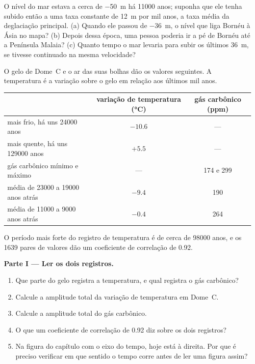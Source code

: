 \begin{exercise}[$\star\star\star$]\label{exo:g12:past-climates:15}
O nível do mar estava a cerca de \qty{-50}{m} há \num{11000} anos; suponha
que ele tenha subido então a uma taxa constante de \qty{12}{m} por mil anos,
a taxa média da deglaciação principal. (a) Quando ele passou de
\qty{-36}{m}, o nível que liga Bornéu à Ásia no mapa? (b) Depois dessa
época, uma pessoa poderia ir a pé de Bornéu até a Península Malaia? (c)
Quanto tempo o mar levaria para subir os últimos \qty{36}{m}, se tivesse
continuado na mesma velocidade?
\end{exercise}

\begin{problem}
\label{pb:g12:past-climates:1}
O gelo de Dome~C e o ar das suas bolhas dão os valores seguintes. A
temperatura é a variação sobre o gelo em relação aos últimos mil anos.

\begin{center}
\small
\begin{tabular}{|l|c|c|}
\hline
 & \textbf{variação de temperatura (\unit{\degreeCelsius})} & \textbf{gás carbônico (ppm)} \\
\hline
mais frio, há uns \num{24000} anos & $-10.6$ & --- \\
mais quente, há uns \num{129000} anos & $+5.5$ & --- \\
gás carbônico mínimo e máximo & --- & 174 e 299 \\
média de \num{23000} a \num{19000} anos atrás & $-9.4$ & 190 \\
média de \num{11000} a \num{9000} anos atrás & $-0.4$ & 264 \\
\hline
\end{tabular}
\end{center}

O período mais forte do registro de temperatura é de cerca de \num{98000}
anos, e os 1639 pares de valores dão um coeficiente de correlação de 0.92.

\medskip
\noindent\textbf{Parte I --- Ler os dois registros.}
\begin{enumerate}
  \item Que parte do gelo registra a temperatura, e qual registra o gás
        carbônico?
  \item Calcule a amplitude total da variação de temperatura em Dome~C.
  \item Calcule a amplitude total do gás carbônico.
  \item O que um coeficiente de correlação de 0.92 diz sobre os dois
        registros?
  \item Na figura do capítulo com o eixo do tempo, hoje está à direita. Por
        que é preciso verificar em que sentido o tempo corre antes de ler uma
        figura assim?
\end{enumerate}


\end{problem}
